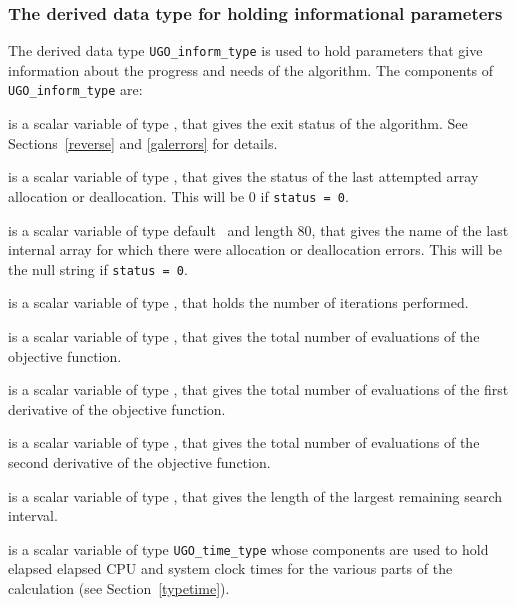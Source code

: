 \documentclass{galahad}
\newcommand{\packagename}{UGO}
\begin{document}

\subsubsection{The derived data type for holding informational
 parameters}\label{typeinform}
The derived data type
{\tt \packagename\_inform\_type}
is used to hold parameters that give information about the progress and needs
of the algorithm. The components of
{\tt \packagename\_inform\_type}
are:

\begin{description}
 is a scalar variable of type \integer, that gives the
exit status of the algorithm.
See Sections~\ref{reverse} and \ref{galerrors} for details.

 is a scalar variable of type \integer, that gives
the status of the last attempted array allocation or deallocation.
This will be 0 if {\tt status = 0}.

 is a scalar variable of type default \character\
and length 80, that  gives the name of the last internal array
for which there were allocation or deallocation errors.
This will be the null string if {\tt status = 0}.

 is a scalar variable of type \integer, that holds the
number of iterations performed.

 is a scalar variable of type \integer, that gives the
total number of evaluations of the objective function.

 is a scalar variable of type \integer, that gives the
total number of evaluations of the first derivative of the objective function.

 is a scalar variable of type \integer, that gives the
total number of evaluations of the second derivative of the objective function.

 is a scalar variable of type \integer,
that gives the length of the largest remaining search interval.

 is a scalar variable of type {\tt \packagename\_time\_type}
whose components are used to hold elapsed elapsed CPU and system clock
times for the various parts of the calculation (see Section~\ref{typetime}).

\end{description}

\end{document}
